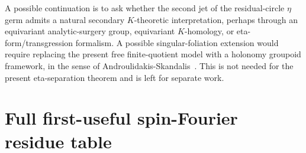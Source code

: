 \documentclass{article}
\theoremstyle{definition}
\numberwithin{equation}{section}
\begin{document}
A possible continuation is to ask whether the second jet of the residual-circle $\eta$ germ admits a natural secondary $K$-theoretic interpretation, perhaps through an equivariant analytic-surgery group, equivariant $K$-homology, or eta-form/transgression formalism.  A possible singular-foliation extension would require replacing the present free finite-quotient model with a holonomy groupoid framework, in the sense of Androulidakis-Skandalis~\cite{AndroulidakisSkandalis}.  This is not needed for the present eta-separation theorem and is left for separate work.

\FloatBarrier


\appendix


\section{Full first-useful spin-Fourier residue table}
\label{app:first-useful-spin-fourier-table}
\end{document}
